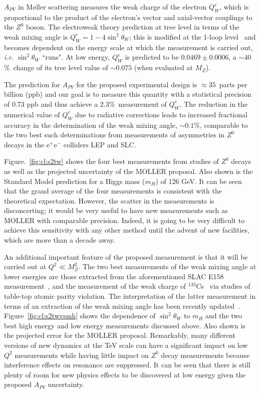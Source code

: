 $A_{PV}$ in M\o ller scattering measures the weak charge of the electron
$Q^e_W$, which is proportional to the product of the electron's vector and axial-vector couplings to the $Z^0$ boson. 
The electroweak theory prediction at tree level in terms of the weak mixing angle is $Q^e_W = 1 - 4\sin^2\theta_W$; 
this is modified at the 1-loop level~\cite{ref:cl:Czarnecki:1995fw, ref:cl:Czarnecki:2000ic, ref:cl:Erler:2004in} and
becomes dependent on the energy scale at which the measurement is carried out, {\em i.e.} $\sin^2\theta_W$
``runs". At low energy, $Q^e_W$  is predicted to be 
$0.0469\pm 0.0006$, a $\sim 40$\%\ change of its tree level value of $\sim 0.075$ (when evaluated at $M_Z$).

The prediction for $A_{PV}$ for the proposed experimental design is 
$\approx 35$~parts per billion (ppb) and our goal is to measure this quantity with a statistical precision of 0.73 ppb
and thus achieve a 2.3\%\ measurement of $Q^e_W$. The reduction in the numerical value of $Q^e_W$ 
due to radiative corrections leads to increased fractional accuracy in the determination of the weak mixing
 angle, $\sim 0.1$\%, comparable to the two best such determinations from measurements of asymmetries in
$Z^0$ decays in the $\mathrm{e}^+\mathrm{e}^-$ colliders LEP and SLC. 

Figure.~\ref{fig:cl:s2tw} shows
the four best measurements from studies of $Z^{0}$ decays~\cite{ref:cl:lepewwg}
as well as the projected uncertainty of the MOLLER proposal. Also shown
is the Standard Model prediction for a Higgs mass ($m_H$) of 126 GeV. It can be seen that the grand average of the
four measurements is consistent with the theoretical expectation. However, the scatter in the measurements
is disconcerting; it would be very useful to have new measurements such as MOLLER with comparable precision. 
Indeed, it is going to be very difficult to achieve this sensitivity with any other method 
until the advent of new facilities, which are more than a decade away.

An additional important feature of the proposed measurement is that it will be carried out at $Q^2\ll M_Z^2$.
The two best measurements of the weak mixing angle at lower energies are those extracted from the
aforementioned SLAC E158 measurement~\cite{ref:cl:Anthony:2005pm}, 
and the measurement of the weak charge of $^{133}$Cs~\cite{ref:cl:csapv} via studies of table-top atomic parity violation. The interpretation of the latter measurement in terms of an extraction of the weak mixing angle has
been recently updated~\cite{ref:cl:cuspidate}. Figure~\ref{fig:cl:s2twvsmh} shows the dependence 
of $\sin^2\theta_W$ to $m_H$ and the two best high energy and low energy measurements discussed above.
Also shown is the projected error for the MOLLER proposal. Remarkably, many different versions of new dynamics
at the TeV scale can have a significant impact on low $Q^2$ measurements while having little impact on
$Z^0$ decay measurements because interference effects on resonance are suppressed. It can be seen that there
is still plenty of room for new physics effects to be discovered at low energy given the proposed $A_{PV}$ 
uncertainty. 

